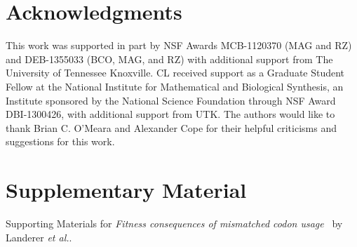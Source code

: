 \documentclass[12pt]{article}
\begin{document}
\section*{Acknowledgments}

This work was supported in part by NSF Awards MCB-1120370 (MAG and RZ) and DEB-1355033 (BCO, MAG, and RZ) with additional support from The University of Tennessee Knoxville. 
CL received support as a Graduate Student Fellow at the National Institute for Mathematical and Biological Synthesis, an Institute sponsored by the National Science Foundation through NSF Award DBI-1300426, with additional support from UTK. 
The authors would like to thank Brian C. O'Meara and Alexander Cope for their helpful criticisms and suggestions for this work.





\clearpage
\section*{Supplementary Material}
\beginsupplement

Supporting Materials for \emph{Fitness consequences of mismatched codon usage} \ by Landerer \emph{et al.}.
\end{document}
